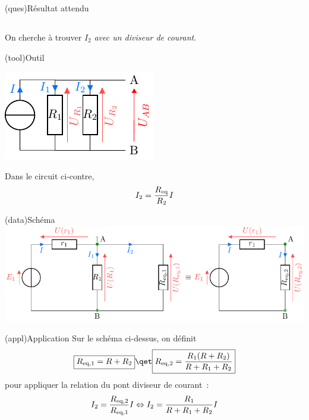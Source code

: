 \documentclass[../../main/main.tex]{subfiles}
\begin{document}
{\begin{tcbraster}[raster columns=2, raster equal height=rows]
    \begin{tcb}[](ques){Résultat attendu}
        \subsection{}
        On cherche à trouver $I_2$ \textit{avec un diviseur de courant}.
    \end{tcb}
    \begin{tcb}[sidebyside, righthand ratio=0.4](tool){Outil}
        \begin{center}
            \includegraphics[]{divcour}
        \end{center}
        \tcblower
        \begin{center}
            Dans le circuit ci-contre,
            \[ I_2 = \frac{R_{\rm eq}}{R_2}I\]
        \end{center}
    \end{tcb}
\end{tcbraster}
\begin{tcb}[](data){Schéma}
    \includegraphics[width=\linewidth]{calc_intens-divcour}
\end{tcb}
\begin{tcb}(appl){Application}
    Sur le schéma ci-dessus, on définit
    \[ \boxed{R_{\rm eq,1} = R+R_2} \qet \boxed{R_{\rm eq,2} =
        \frac{R_1(R+R_2)}{R + R_1 + R_2}}\]
    pour appliquer la relation du pont diviseur de courant~:
    \begin{equation*}
        I_2                 = \frac{R_{\rm eq, 2}}{R_{\rm eq,1}}I
        \Leftrightarrow I_2 = \frac{R_1}{R + R_1 + R_2}I

\end{equation*}
\end{tcb}}
\end{document}

